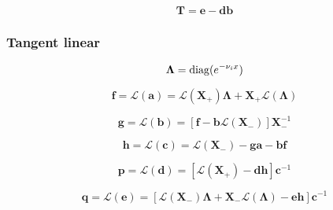 \begin{equation}
\mathbf{T} = \mathbf{e} - \mathbf{d}\mathbf{b}
\label{eq:global_r_and_t_from_eigenvalues_matrix-forward-T}
\end{equation}


%
\subsubsection{Tangent linear}
\label{sec:global_r_and_t_from_eigenvalues_matrix-tangent_linear}

\begin{equation}
\mathbf{\Lambda} = \mathrm{diag}(e^{-\nu_{i}x})
\label{eq:global_r_and_t_from_eigenvalues_matrix-tangent_linear-Lambda}
\end{equation}

\begin{equation}
\mathbf{f} = \mathcal{L}(\mathbf{a}) = \mathcal{L}(\mathbf{X}_{+})\mathbf{\Lambda} + \mathbf{X}_{+}\mathcal{L}(\mathbf{\Lambda})
\label{eq:global_r_and_t_from_eigenvalues_matrix-tangent_linear-f}
\end{equation}

\begin{equation}
\mathbf{g} = \mathcal{L}(\mathbf{b}) = \left[\mathbf{f} - \mathbf{b}\mathcal{L}(\mathbf{X}_{-})\right]\mathbf{X}^{-1}_{-}
\label{eq:global_r_and_t_from_eigenvalues_matrix-tangent_linear-g}
\end{equation}

\begin{equation}
\mathbf{h} = \mathcal{L}(\mathbf{c}) = \mathcal{L}(\mathbf{X}_{-}) - \mathbf{g}\mathbf{a} - \mathbf{b}\mathbf{f}
\label{eq:global_r_and_t_from_eigenvalues_matrix-tangent_linear-h}
\end{equation}

\begin{equation}
\mathbf{p} = \mathcal{L}(\mathbf{d}) = \left[\mathcal{L}(\mathbf{X}_{+}) - \mathbf{d}\mathbf{h}\right]\mathbf{c}^{-1}
\label{eq:global_r_and_t_from_eigenvalues_matrix-tangent_linear-p}
\end{equation}

\begin{equation}
\mathbf{q} = \mathcal{L}(\mathbf{e}) = \left[\mathcal{L}(\mathbf{X}_{-})\mathbf{\Lambda} + \mathbf{X}_{-}\mathcal{L}(\mathbf{\Lambda}) - \mathbf{e}\mathbf{h}\right]\mathbf{c}^{-1}
\label{eq:global_r_and_t_from_eigenvalues_matrix-tangent_linear-q}
\end{equation}


